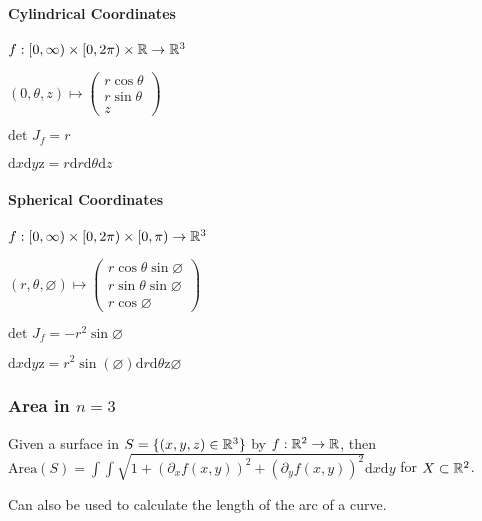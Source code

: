\paragraph{Cylindrical Coordinates}
\begin{compactitem}
    \item $f: [0, \infty) \times [0, 2 \pi) \times \mathbb{R} \to \mathbb{R}^3$
    \item $(0, \theta, z) \mapsto 
        \begin{pmatrix}
            r \cos \theta\\
            r \sin \theta\\
            z
        \end{pmatrix}$
    \item $\text{det }J_f = r$
    \item $\mathrm{d}x\mathrm{d}y\mathrm{z} = r\mathrm{d}r\mathrm{d}\theta\mathrm{d}z$
\end{compactitem}

\paragraph{Spherical Coordinates}
\begin{compactitem}
    \item $f: [0, \infty) \times [0, 2 \pi) \times [0, \pi) \to \mathbb{R}^3$
    \item $(r, \theta, \varnothing) \mapsto
        \begin{pmatrix}
            r \cos \theta \sin \varnothing\\
            r \sin \theta \sin \varnothing\\
            r \cos \varnothing
        \end{pmatrix}$
    \item $\text{det } J_f = -r^2 \sin \varnothing$
    \item $\mathrm{d}x\mathrm{d}y\mathrm{z} = r^2 \sin(\varnothing)\mathrm{d}r\mathrm{d}\theta\mathrm{z}\varnothing$
\end{compactitem}

\subsubsection{Area in $n = 3$}
Given a surface in $S = \{(x, y, z) \in \mathbb{R}^3\}$ by $f: \mathbb{R}^2 \to \mathbb{R}$, then $\text{Area}(S) = \int \int \sqrt{1 + (\partial_x f(x, y))^2 + (\partial_y f(x, y))^2} \mathrm{d}x\mathrm{d}y$ for $X \subset \mathbb{R}^2$.

\begin{compactitem}
    \item Can also be used to calculate the length of the arc of a curve.
\end{compactitem}

